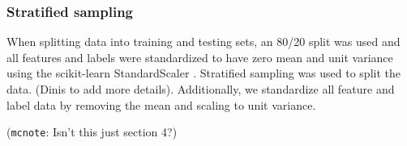 \documentclass[journal=jacsat,manuscript=article]{achemso}
\newcommand{\adnote}[1]{{\color{OliveGreen} (\texttt{adnote}: #1)}}
\newcommand{\mcnote}[1]{{\color{Plum} (\texttt{mcnote}: #1)}}
\begin{document}



\subsubsection{Stratified sampling}
When splitting data into training and testing sets, an 80/20 split was used and all features and labels were standardized to have zero mean and unit variance using the scikit-learn StandardScaler \cite{scikit-learn} . Stratified sampling was used to split the data. (Dinis to add more details). Additionally, we standardize all feature and label data by removing the mean and scaling to unit variance.

\mcnote{Isn't this just section 4?}
\end{document}

